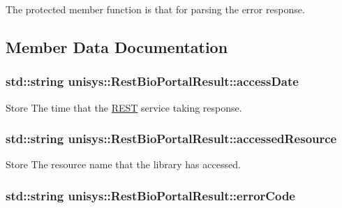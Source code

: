 The protected member function is that for parsing the error response. 



\subsection{Member Data Documentation}
\hypertarget{classunisys_1_1RestBioPortalResult_a67d51545778745539af85cb77d53b621}{
\subsubsection[{access\-Date}]{\setlength{\rightskip}{0pt plus 5cm}std\-::string unisys\-::\-Rest\-Bio\-Portal\-Result\-::access\-Date\hspace{0.3cm}{\ttfamily [protected]}}}\label{classunisys_1_1RestBioPortalResult_a67d51545778745539af85cb77d53b621}


Store The time that the \hyperlink{classunisys_1_1REST}{R\-E\-S\-T} service taking response. 

\hypertarget{classunisys_1_1RestBioPortalResult_a38a4f0567088f5ab6dc61d0943a7c4ed}{
\subsubsection[{accessed\-Resource}]{\setlength{\rightskip}{0pt plus 5cm}std\-::string unisys\-::\-Rest\-Bio\-Portal\-Result\-::accessed\-Resource\hspace{0.3cm}{\ttfamily [protected]}}}\label{classunisys_1_1RestBioPortalResult_a38a4f0567088f5ab6dc61d0943a7c4ed}


Store The resource name that the library has accessed. 

\hypertarget{classunisys_1_1RestBioPortalResult_a05d2659a4f59d8e2e590cae364e8d8a3}{
\subsubsection[{error\-Code}]{\setlength{\rightskip}{0pt plus 5cm}std\-::string unisys\-::\-Rest\-Bio\-Portal\-Result\-::error\-Code\hspace{0.3cm}{\ttfamily [protected]}}}\label{classunisys_1_1RestBioPortalResult_a05d2659a4f59d8e2e590cae364e8d8a3}


